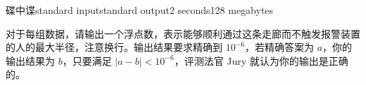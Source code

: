 \begin{problem}{碟中谍}{standard input}{standard output}{2 seconds}{128 megabytes}
    \OutputFile
    
    对于每组数据，请输出一个浮点数，表示能够顺利通过这条走廊而不触发报警装置的人的最大半径，注意换行。输出结果要求精确到 $10^{-6}$，若精确答案为 $a$，你的输出结果为 $b$，只要满足 $|a-b|<10^{-6}$，评测法官 Jury 就认为你的输出是正确的。

    
    \Example
    
    \begin{example}
    \end{example}

\end{problem}